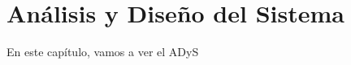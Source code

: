 \chapter{Análisis y Diseño del Sistema}\label{ch:Análisis y diseño del sistema}
En este capítulo, vamos a ver el ADyS


